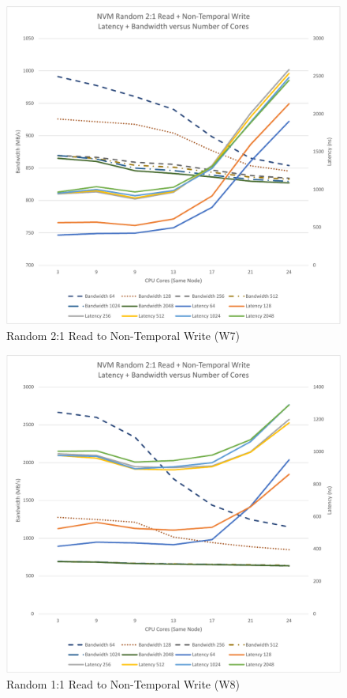 \begin{figure}
    \centering
    \caption{Random 2:1 Read to Non-Temporal Write (W7)}\label{chart:random:W7}
    \includegraphics[scale=0.5]{charts/random-w7-crop.pdf}
\end{figure}

\begin{figure}
    \centering
    \caption{Random 1:1 Read to Non-Temporal Write (W8)}\label{chart:random:W8}
    \includegraphics[scale=0.5]{charts/random-w8-crop.pdf}
\end{figure}

